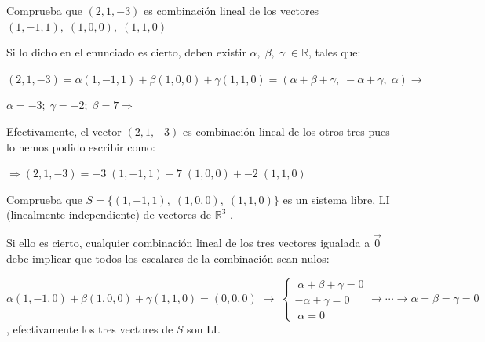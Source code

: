 \begin{ejre}
Comprueba que $(2,1,-3)$ es combinación lineal de los vectores $	(1,-1,1),\; (1,0,0),\; (1,1,0)$
\end{ejre}
\begin{proofw}\renewcommand{\qedsymbol}{$\diamond$}

Si lo dicho en el enunciado es cierto, deben existir $\alpha, \; \beta, \; \gamma \; \in \mathbb R$, tales que:

\noindent $(2,1,-3)=\alpha (1,-1,1)+  \beta (1,0,0)+ \gamma (1,1,0)=(\alpha+\beta+\gamma, \; -\alpha+\gamma,\; \alpha) \to$

\noindent $\alpha=-3; \; \gamma=-2; \; \beta=7 \Rightarrow $


\noindent Efectivamente, el vector $(2,1,-3)$ es combinación lineal de los otros tres pues lo hemos podido escribir como:

\noindent $ \Rightarrow (2,1,-3)=\boxed{-3}\;  (1,-1,1)+  \boxed{7}\;  (1,0,0)+ \boxed{-2}\;  (1,1,0)$
\end{proofw}


\begin{ejre}
Comprueba que $S=\{ (1,-1,1),\; (1,0,0),\; (1,1,0) \}$ es un sistema libre, LI (linealmente independiente) de vectores de $\mathbb R^3$	.
\end{ejre}
\begin{proofw}\renewcommand{\qedsymbol}{$\diamond$}
	Si ello es cierto, cualquier combinación lineal de los tres vectores igualada a $\vec 0$ debe implicar que todos los escalares de la combinación sean nulos:

\noindent $\alpha (1,-1,0)+\beta (1,0,0) +\gamma (1,1,0)=(0,0,0) \; \to \; \begin{cases}  \; \alpha+\beta+\gamma=0\\ -\alpha+\gamma=0\\ \; \alpha=0 \end{cases} \rightarrow \cdots \to \alpha=\beta=\gamma=0$, efectivamente los tres vectores de $S$ son LI.
	
\end{proofw}


